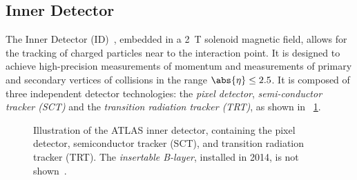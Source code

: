 \subsection{Inner Detector}\label{sec:method:ID}
The Inner Detector (ID)~\cite{ATLAS:ID-TDR}, embedded in a \SI{2}{\tesla} solenoid magnetic field, allows for the tracking of charged particles near to the interaction point. It is designed to achieve high-precision measurements of momentum and measurements of primary and secondary vertices of collisions in the range $\abs{\eta} \leq 2.5$. It is composed of three independent detector technologies: the \emph{pixel detector}, \emph{semi-conductor tracker (SCT)} and the \emph{transition radiation tracker (TRT)}, as shown in ~\cref{fig:method:ATLAS:ID}. 

\begin{figure}
    \centering
    \caption[Illustration of the ATLAS inner detector]{Illustration of the ATLAS inner detector, containing the pixel detector, semiconductor tracker (SCT), and transition radiation tracker (TRT). The \emph{insertable B-layer}, installed in 2014, is not shown~\cite{ATLASIDImage}.}
    \label{fig:method:ATLAS:ID}
\end{figure}

